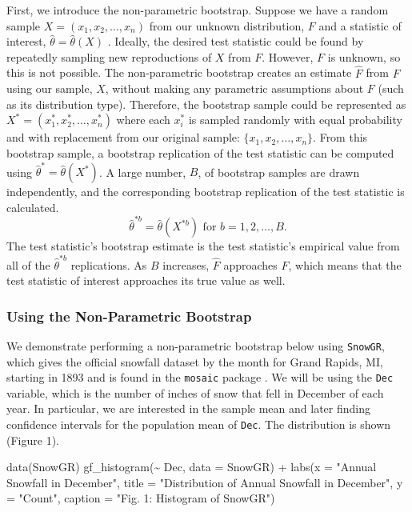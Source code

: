 \documentclass[12pt]{article}
\newenvironment{Shaded}{\begin{snugshade}}{\end{snugshade}}
\newcommand{\AttributeTok}[1]{\textcolor[rgb]{0.77,0.63,0.00}{#1}}
\newcommand{\FunctionTok}[1]{\textcolor[rgb]{0.00,0.00,0.00}{#1}}
\newcommand{\NormalTok}[1]{#1}
\newcommand{\SpecialCharTok}[1]{\textcolor[rgb]{0.00,0.00,0.00}{#1}}
\newcommand{\StringTok}[1]{\textcolor[rgb]{0.31,0.60,0.02}{#1}}
\begin{document}
First, we introduce the non-parametric bootstrap. Suppose we have a
random sample \(X = (x_1,x_2,\dots,x_n)\) from our unknown distribution,
\(F\) and a statistic of interest, \(\hat{\theta} = \hat{\theta}(X)\)
\citep{EfronCasi}. Ideally, the desired test statistic could be found by
repeatedly sampling new reproductions of \(X\) from \(F\). However,
\(F\) is unknown, so this is not possible. The non-parametric bootstrap
creates an estimate \(\hat{F}\) from \(F\) using our sample, \(X\),
without making any parametric assumptions about \(F\) (such as its
distribution type). Therefore, the bootstrap sample could be represented
as \(X^* = (x^*_1, x^*_2, \dots, x^*_n)\) where each \(x^*_i\) is
sampled randomly with equal probability and with replacement from our
original sample: \(\{x_1,x_2,\dots,x_n\}\). From this bootstrap sample,
a bootstrap replication of the test statistic can be computed using
\(\hat{\theta}^* = \hat{\theta}(X^*)\). A large number, \(B\), of
bootstrap samples are drawn independently, and the corresponding
bootstrap replication of the test statistic is calculated.
\[\hat{\theta}^{*b} = \hat{\theta}(X^{*b}) \text{ for } b = 1,2, \dots, B.\]
The test statistic's bootstrap estimate is the test statistic's
empirical value from all of the \(\hat{\theta}^{*b}\) replications. As
\(B\) increases, \(\hat{F}\) approaches \(F\), which means that the test
statistic of interest approaches its true value as well.

\hypertarget{using-the-non-parametric-bootstrap}{%
\subsubsection{Using the Non-Parametric
Bootstrap}\label{using-the-non-parametric-bootstrap}}

We demonstrate performing a non-parametric bootstrap below using
\texttt{SnowGR}, which gives the official snowfall dataset by the month
for Grand Rapids, MI, starting in 1893 and is found in the
\texttt{mosaic} package \citep{mosaic}. We will be using the
\texttt{Dec} variable, which is the number of inches of snow that fell
in December of each year. In particular, we are interested in the sample
mean and later finding confidence intervals for the population mean of
\texttt{Dec}. The distribution is shown (Figure 1).

\begin{Shaded}
\begin{Highlighting}[]
\FunctionTok{data}\NormalTok{(SnowGR)}
\FunctionTok{gf\_histogram}\NormalTok{(}\SpecialCharTok{\textasciitilde{}}\NormalTok{ Dec, }\AttributeTok{data =}\NormalTok{ SnowGR) }\SpecialCharTok{+}
  \FunctionTok{labs}\NormalTok{(}\AttributeTok{x =} \StringTok{"Annual Snowfall in December"}\NormalTok{, }
       \AttributeTok{title =} \StringTok{"Distribution of Annual Snowfall in December"}\NormalTok{, }\AttributeTok{y =} \StringTok{"Count"}\NormalTok{,}
       \AttributeTok{caption =} \StringTok{"Fig. 1: Histogram of SnowGR"}\NormalTok{)}
\end{Highlighting}
\end{Shaded}
\end{document}

